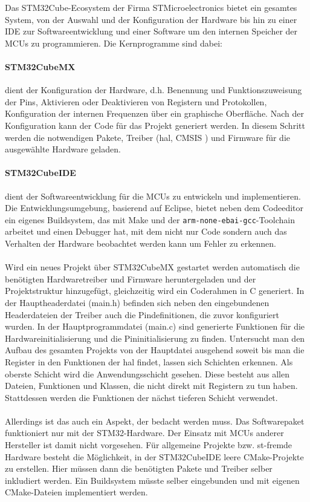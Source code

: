 Das STM32Cube-Ecosystem \cite{stm32cube_ecosystem} der Firma STMicroelectronics bietet ein gesamtes System, von der Auswahl und der Konfiguration der Hardware bis hin zu einer IDE zur Softwareentwicklung und einer Software um den internen Speicher der MCUs zu programmieren.
Die Kernprogramme sind dabei:

\paragraph{STM32CubeMX} 
	dient der Konfiguration der Hardware, d.h. Benennung und Funktionszuweisung der Pins, Aktivieren oder Deaktivieren von Registern und Protokollen, Konfiguration der internen Frequenzen über ein graphische Oberfläche.
	Nach der Konfiguration kann der Code für das Projekt generiert werden.
	In diesem Schritt werden die notwendigen Pakete, Treiber (\gls{hal}, CMSIS %
	) und Firmware für die ausgewählte Hardware geladen. \cite{stm32cubemx}

\paragraph{STM32CubeIDE}
	dient der Softwareentwicklung für die MCUs zu entwickeln und implementieren.
	Die Entwicklungsumgebung, basierend auf Eclipse, bietet neben dem Codeeditor ein eigenes Buildsystem, das mit Make und der \texttt{arm-none-ebai-gcc}-Toolchain arbeitet und einen Debugger hat, mit dem nicht nur Code sondern auch das Verhalten der Hardware beobachtet werden kann um Fehler zu erkennen. \cite{stm32cubeide}
\\
\\
Wird ein neues Projekt über STM32CubeMX gestartet werden automatisch die benötigten Hardwaretreiber und Firmware heruntergeladen und der Projektstruktur hinzugefügt, gleichzeitig wird ein Coderahmen in C generiert. 
In der Hauptheaderdatei (main.h) befinden sich neben den eingebundenen Headerdateien der Treiber auch die Pindefinitionen, die zuvor konfiguriert wurden.
In der Hauptprogrammdatei (main.c) sind generierte Funktionen für die Hardwareinitialisierung und die Pininitialisierung zu finden.
Untersucht man den Aufbau des gesamten Projekts von der Hauptdatei ausgehend soweit bis man die Register in den Funktionen der \gls{hal} findet, lassen sich Schichten erkennen.
Als oberste Schicht wird die Anwendungsschicht gesehen.
Diese besteht aus allen Dateien, Funktionen und Klassen, die nicht direkt mit Registern zu tun haben.
Stattdessen werden die Funktionen der nächst tieferen Schicht verwendet.
\\
\\
Allerdings ist das auch ein Aspekt, der bedacht werden muss. 
Das Softwarepaket funktioniert nur mit der STM32-Hardware.
Der Einsatz mit MCUs anderer Hersteller ist damit nicht vorgesehen.
Für allgemeine Projekte bzw. st-fremde Hardware besteht die Möglichkeit, in der STM32CubeIDE leere CMake-Projekte zu erstellen.
Hier müssen dann die benötigten Pakete und Treiber selber inkludiert werden.
Ein Buildsystem müsste selber eingebunden und mit eigenen CMake-Dateien implementiert werden.


